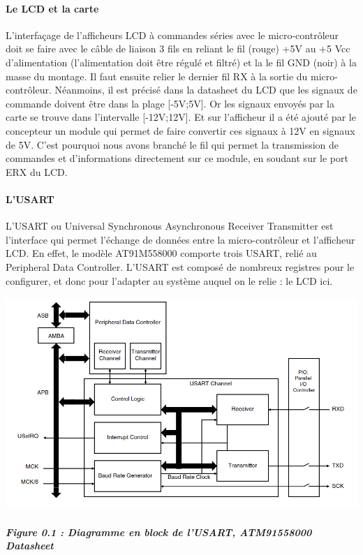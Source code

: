 \documentclass[a4paper]{report}
\begin{document}
      			\paragraph{Le LCD et la carte}
      				L’interfaçage de l'afficheurs LCD à commandes séries avec le micro-contrôleur doit se faire avec le câble de liaison 3 fils en reliant le fil (rouge) +5V au +5 Vcc d’alimentation (l’alimentation doit être régulé et filtré) et la le fil GND (noir) à la masse du montage. Il faut ensuite relier le dernier fil RX à la sortie du micro-contrôleur.
					Néanmoins, il est précisé dans la datasheet du LCD que les signaux de commande doivent être dans la plage [-5V;5V]. Or les signaux envoyés par la carte se trouve dans l'intervalle [-12V;12V]. Et sur l'afficheur il a été ajouté par le concepteur un module qui permet de faire convertir ces signaux à 12V en signaux de 5V. C'est pourquoi nous avons branché le fil qui permet la transmission de commandes et d'informations directement sur ce module, en soudant sur le port ERX du LCD.
				\paragraph{L'USART}
					L'USART ou Universal Synchronous Asynchronous Receiver Transmitter est l'interface qui permet l'échange de données entre la micro-contrôleur et l'afficheur LCD. En effet, le modèle AT91M558000 comporte trois USART, relié au Peripheral Data Controller. L'USART est composé de nombreux registres pour le configurer, et donc pour l'adapter au système auquel on le relie : le LCD ici.

					\includegraphics[width=15cm,height=8cm]{images/USART.png}
					\paragraph{\textit{Figure 0.1 : Diagramme en block de l'USART, ATM91558000 Datasheet}}
\end{document}

